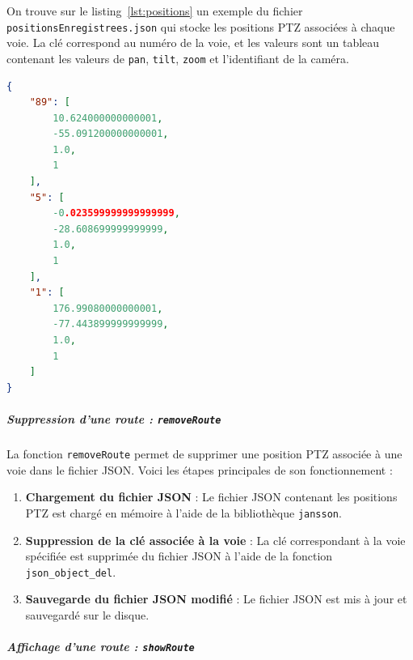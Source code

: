 \documentclass[a4paper, 11pt, french]{article}
\newcounter{obj}
\begin{document}
On trouve sur le listing~\ref{lst:positions} un exemple du fichier \texttt{positionsEnregistrees.json} qui stocke les positions PTZ associées à chaque voie. La clé correspond au numéro de la voie, et les valeurs sont un tableau contenant les valeurs de \texttt{pan}, \texttt{tilt}, \texttt{zoom} et l'identifiant de la caméra.


\begin{lstlisting}[language=json, caption={Exemple du fichier \texttt{positionsEnregistrees.json}}, label={lst:positions}]
{
    "89": [
        10.624000000000001,
        -55.091200000000001,
        1.0,
        1
    ],
    "5": [
        -0.023599999999999999,
        -28.608699999999999,
        1.0,
        1
    ],
    "1": [
        176.99080000000001,
        -77.443899999999999,
        1.0,
        1
    ]
}
\end{lstlisting}


\subparagraph{Suppression d'une route : \texttt{removeRoute}}

La fonction \texttt{removeRoute} permet de supprimer une position PTZ associée à une voie dans le fichier JSON. Voici les étapes principales de son fonctionnement :
\begin{enumerate}
    \item \textbf{Chargement du fichier JSON} :
        Le fichier JSON contenant les positions PTZ est chargé en mémoire à l'aide de la bibliothèque \texttt{jansson}.

    \item \textbf{Suppression de la clé associée à la voie} :
        La clé correspondant à la voie spécifiée est supprimée du fichier JSON à l'aide de la fonction \texttt{json\_object\_del}.
    
    \item \textbf{Sauvegarde du fichier JSON modifié} :
        Le fichier JSON est mis à jour et sauvegardé sur le disque. 
    
\end{enumerate}


\subparagraph{Affichage d'une route : \texttt{showRoute}}
\end{document}
